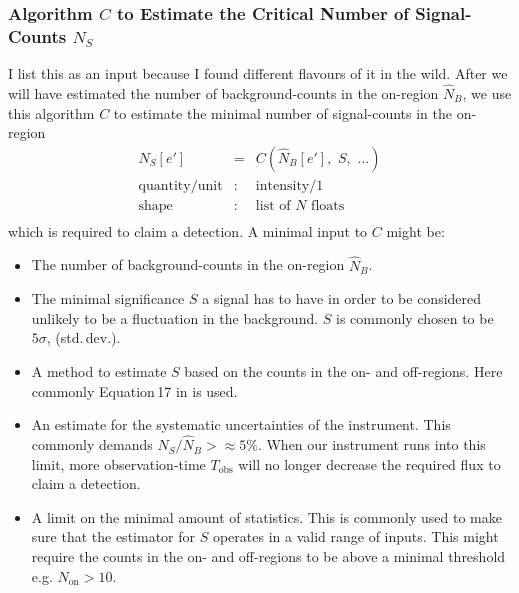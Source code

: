 \documentclass{article}%
\begin{document}
            \subsubsection*{Algorithm $C$ to Estimate the Critical Number of Signal-Counts $N_S$}
                I list this as an input because I found different flavours of it in the wild.
                After we will have estimated the number of background-counts in the on-region $\hat{N}_B$, we use this algorithm $C$ to estimate the minimal number of signal-counts in the on-region
                \begin{eqnarray*}
                    N_S[e'] &=& C(\hat{N}_B[e'],\,\,S,\,\,\dots)\\
                    \text{quantity}/\text{unit} &:& \text{intensity}/1\\
                    \text{shape} &:& \text{list of}\,\,N\,\,\text{floats}\\
                \end{eqnarray*}
                which is required to claim a detection.
                A minimal input to $C$ might be:
                \begin{itemize}
                    \item{}
                        The number of background-counts in the on-region $\hat{N}_B$.
                    \item{}
                        The minimal significance $S$ a signal has to have in order to be considered unlikely to be a fluctuation in the background.
                        $S$ is commonly chosen to be $5\sigma$, (std.\,dev.).
                    \item{}
                        A method to estimate $S$ based on the counts in the on- and off-regions. Here commonly Equation\,17 in \cite{li1983analysis} is used.
                    \item{}
                        An estimate for the systematic uncertainties of the instrument. This commonly demands $N_S/\hat{N}_B >\approx 5\%$.
                        When our instrument runs into this limit, more observation-time $T_\text{obs}$ will no longer decrease the required flux to claim a detection.
                    \item{}
                        A limit on the minimal amount of statistics. This is commonly used to make sure that the estimator for $S$ operates in a valid range of inputs.
                        This might require the counts in the on- and off-regions to be above a minimal threshold e.g. $N_\text{on} > 10$.
                \end{itemize}
\end{document}
